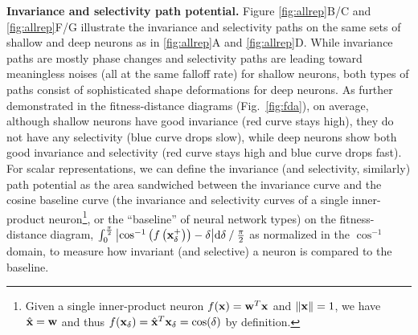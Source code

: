 \documentclass[10pt,twocolumn,letterpaper]{article}
\begin{document}

\newcommand{\defbaseline}{Given a single inner-product neuron $f({\bf{x}}) = {\bf{w}}^{T}{\bf{x}}$ and $\left\| \bf{x} \right\| = 1$, we have $\hat{\bf{x}} = \bf{w}$ and thus $f({\bf{x}}_{\delta}) = {\hat{\bf{x}}}^{T}{\bf{x}}_{\delta} = \cos(\delta)$ by definition.}

{\bf Invariance and selectivity path potential.} Figure \ref{fig:allrep}B/C and \ref{fig:allrep}F/G illustrate the invariance and selectivity paths on the same sets of shallow and deep neurons as in \ref{fig:allrep}A and \ref{fig:allrep}D.
While invariance paths are mostly phase changes and selectivity paths are leading toward meaningless noises (all at the same falloff rate) for shallow neurons, both types of paths consist of sophisticated shape deformations for deep neurons.
As further demonstrated in the fitness-distance diagrams \cite{jones1995fitness} (Fig.~\ref{fig:fda}), on average, although shallow neurons have good invariance (\ie red curve stays high), they do not have any selectivity (\ie blue curve drops slow), while deep neurons show both good invariance and selectivity (\ie red curve stays high and blue curve drops fast).
For scalar representations, we can define the invariance (and selectivity, similarly) path potential as the area sandwiched between the invariance curve and the cosine baseline curve (\ie the invariance and selectivity curves of a single inner-product neuron\footnote{\defbaseline}, or the ``baseline'' of neural network types) on the fitness-distance diagram, \ie $\int_{0}^{\frac{\pi}{2}}{\left| \cos^{-1}\left(f\left( \bf{x}^{+}_{\delta} \right)\right) - \delta \right|}\mathrm{d}\delta \mathbin{/} {\frac{\pi}{2}}$ as normalized in the $\cos^{-1}$ domain, to measure how invariant (and selective) a neuron is compared to the baseline.

\end{document}
